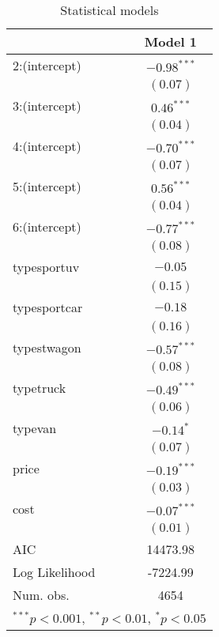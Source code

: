 
\begin{table}
\tiny
\begin{center}
\begin{tabular}{l c }
\hline
 & Model 1 \\
\hline
2:(intercept)  & $-0.98^{***}$ \\
               & $(0.07)$      \\
3:(intercept)  & $0.46^{***}$  \\
               & $(0.04)$      \\
4:(intercept)  & $-0.70^{***}$ \\
               & $(0.07)$      \\
5:(intercept)  & $0.56^{***}$  \\
               & $(0.04)$      \\
6:(intercept)  & $-0.77^{***}$ \\
               & $(0.08)$      \\
typesportuv    & $-0.05$       \\
               & $(0.15)$      \\
typesportcar   & $-0.18$       \\
               & $(0.16)$      \\
typestwagon    & $-0.57^{***}$ \\
               & $(0.08)$      \\
typetruck      & $-0.49^{***}$ \\
               & $(0.06)$      \\
typevan        & $-0.14^{*}$   \\
               & $(0.07)$      \\
price          & $-0.19^{***}$ \\
               & $(0.03)$      \\
cost           & $-0.07^{***}$ \\
               & $(0.01)$      \\
\hline
AIC            & 14473.98      \\
Log Likelihood & -7224.99      \\
Num. obs.      & 4654          \\
\hline
\multicolumn{2}{l}{\scriptsize{$^{***}p<0.001$, $^{**}p<0.01$, $^*p<0.05$}}
\end{tabular}
\caption{Statistical models}
\label{table:coefficients}
\end{center}
\end{table}
